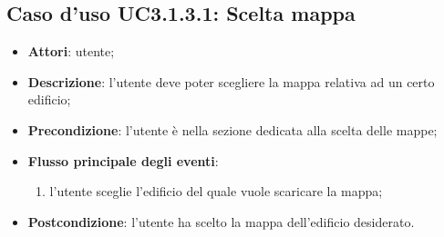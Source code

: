 \documentclass[../AnalisiDeiRequisiti.tex]{subfiles}
\begin{document}
\subsection{Caso d'uso UC3.1.3.1: Scelta mappa}
\begin{itemize}
\item \textbf{Attori}: utente;
\item \textbf{Descrizione}: l'utente deve poter scegliere la mappa relativa ad un certo edificio; 
      \item \textbf{Precondizione}: l'utente è nella sezione dedicata alla scelta delle mappe;

        \item \textbf{Flusso principale degli eventi}:
          \begin{enumerate}
          \item l'utente sceglie l'edificio del quale vuole scaricare la mappa;

      \end{enumerate}
    \item \textbf{Postcondizione}: l'utente ha scelto la mappa dell'edificio desiderato.
  \end{itemize}
\hypertarget{UC3.1.3.2}{}
\end{document}
